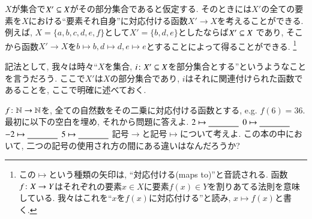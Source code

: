 \begin{example}\label{ex:subset as function}


$X$が集合で$X'\ss X$がその部分集合であると仮定する. そのときには$X'$の全ての要素を$X$における``要素それ自身''に対応付ける函数$X'\to X$を考えることができる. 例えば, $X=\{a,b,c,d,e,f\}$として$X'=\{b,d,e\}$としたならば$X'\ss X$
であり, そこから函数$X'\to X$を$b\mapsto b, d\mapsto d, e\mapsto e$とすることによって得ることができる.
\footnote{この\;\;$\mapsto$\;\;という種類の矢印は, ``対応付ける(maps to)''と音読される. 函数$f\taking X\to Y$はそれぞれの要素$x\in X$に要素$f(x)\in Y$を割りあてる法則を意味している. 我々はこれを``$x$を$f(x)$に対応付ける''と読み, $x\mapsto f(x)$と書く.}


記法として, 我々は時々``$X$を集合, $i\taking X'\ss X$を部分集合とする''というようなことを言うだろう. ここで$X'$は$X$の部分集合であり, $i$はそれに関連付けられた函数であることを, ここで明確に述べておく.

\end{example}

\begin{exercise}
$f\taking\NN\to\NN$を, 全ての自然数をその二乗に対応付ける函数とする, e.g. $f(6)=36$. 最初に以下の空白を埋め, それから問題に答えよ.
\sexc $2\mapsto\ul{\hspace{.5in}}$
\next $0\mapsto\ul{\hspace{.5in}}$
\next $-2\mapsto\ul{\hspace{.5in}}$
\next $5\mapsto\ul{\hspace{.5in}}$
\next 記号$\to$と記号$\mapsto$について考えよ. この本の中において, 二つの記号の使用され方の間にある違いはなんだろうか?
\endsexc
\end{exercise}

